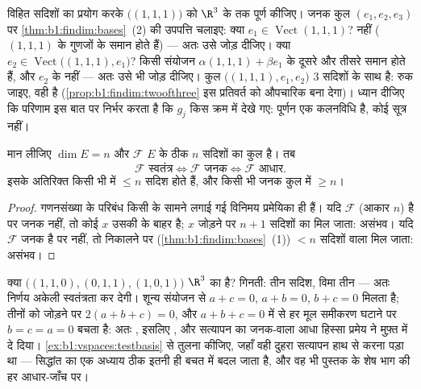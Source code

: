 \begin{example}[पूर्णन कलनविधि चलाकर देखना]
\label{ex:b1:findim:completion}
विहित सदिशों का प्रयोग करके  $\bigl((1,1,1)\bigr)$ को $\R^3$ के
 तक पूर्ण कीजिए। जनक कुल $(e_1, e_2, e_3)$ पर
\cref{thm:b1:findim:bases}~(2) की उपपत्ति चलाइए: क्या $e_1 \in
\operatorname{Vect}(1,1,1)$? नहीं ($(1,1,1)$ के गुणजों के  समान
होते हैं) --- अतः उसे जोड़ दीजिए। क्या $e_2 \in
\operatorname{Vect}\bigl((1,1,1), e_1\bigr)$? किसी संयोजन $\alpha(1,1,1) +
\beta e_1$ के दूसरे और तीसरे  समान होते हैं, और $e_2$ के नहीं ---
अतः उसे भी जोड़ दीजिए। कुल $\bigl((1,1,1), e_1, e_2\bigr)$ $3$ सदिशों के साथ
 है: रुक जाइए, वही  है (\cref{prop:b1:findim:twoofthree} इस
प्रतिवर्त को औपचारिक बना देगा)। ध्यान दीजिए कि परिणाम इस बात पर निर्भर करता
है कि $g_j$ किस क्रम में देखे गए: पूर्णन एक कलनविधि है, कोई सूत्र नहीं।
\end{example}

\begin{proposition}[तीन में से दो वाला नियम]\label{prop:b1:findim:twoofthree}
मान लीजिए $\dim E = n$ और $\mathcal{F}$ $E$ के ठीक $n$ सदिशों का कुल है। तब
\[
\mathcal{F} \text{ स्वतंत्र} \iff \mathcal{F} \text{ जनक} \iff
\mathcal{F} \text{ आधार}.
\]
इसके अतिरिक्त किसी भी  में $\leq n$ सदिश होते हैं, और किसी भी
जनक कुल में $\geq n$।
\end{proposition}

\begin{proof}
गणनसंख्या के परिबंध किसी  के सामने लगाई गई विनिमय प्रमेयिका ही हैं। यदि
$\mathcal{F}$ (आकार $n$)  है पर जनक नहीं, तो कोई $x$ उसकी  के बाहर है; $x$ जोड़ने पर $n + 1$ सदिशों का  मिल जाता:
असंभव। यदि $\mathcal{F}$ जनक है पर  नहीं, तो  निकालने पर
(\cref{thm:b1:findim:bases}~(1)) $< n$ सदिशों वाला  मिल जाता: असंभव।
\end{proof}

\begin{example}[तीन में से दो, आधा काम बचाकर]
\label{ex:b1:findim:twoofthreerun}
क्या $\bigl((1,1,0), (0,1,1), (1,0,1)\bigr)$ $\R^3$ का  है? गिनती: तीन
सदिश, विमा तीन --- अतः निर्णय अकेली स्वतंत्रता कर देगी। शून्य संयोजन से $a +
c = 0$, $a + b = 0$, $b + c = 0$ मिलता है; तीनों को जोड़ने पर $2(a + b + c)
= 0$, और $a + b + c = 0$ में से हर मूल समीकरण घटाने पर $b = c = a = 0$ बचता
है: अतः , इसलिए , और सत्यापन का जनक-वाला आधा हिस्सा प्रमेय ने
मुफ़्त में दे दिया। \cref{ex:b1:vspaces:testbasis} से तुलना कीजिए, जहाँ वही
दुहरा सत्यापन हाथ से करना पड़ा था --- सिद्धांत का एक अध्याय ठीक इतनी ही बचत
में बदल जाता है, और वह भी पुस्तक के शेष भाग की हर आधार-जाँच पर।
\end{example}


